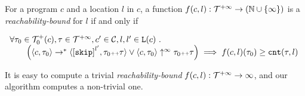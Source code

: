 \begin{defn}
 \label{def:rb}
 For a program ${c}$ and a location $l$ in $c$,
a function $f(c, l) : \mathcal{T}^{+\infty} \to (\mathbb{N} \cup \{\infty\})$ is a \emph{reachability-bound} for $l$ if and only if
{\small
\begin{center}
 $
\begin{array}{ll}
 \forall \trace_0 \in \ftdom_0(c), \trace \in \tdom, c' \in \cdom, l, l' \in \lvar(c) \st 
 \\ \qquad
 \Big(
 \config{{c}, \trace_0} \to^{*} \config{\clabel{\eskip}^{l'}, \trace_0 \tracecat \trace} 
 \lor 
 \config{{c}, \trace_0} \uparrow^{\infty} \trace_0 \tracecat \trace 
 \Big)
 \implies f({c}, l)(\trace_0) \geq \counter(\trace, l) 
 \end{array}
 $
\end{center}
}
\end{defn}
It is easy to compute a trivial \emph{reachability-bound} $f(c, l): \mathcal{T}^{+\infty} \to \infty$, and 
our algorithm computes a non-trivial one.
